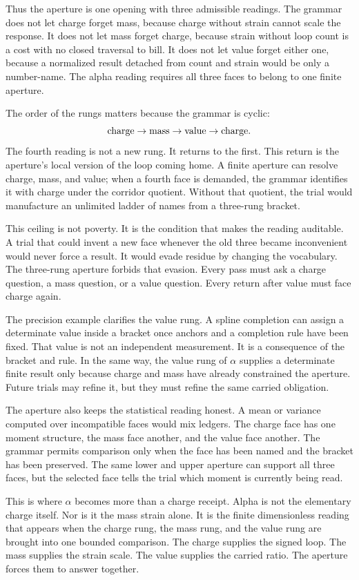 Thus the aperture is one opening with three admissible readings. The grammar
does not let charge forget mass, because charge without strain cannot scale
the response. It does not let mass forget charge, because strain without
loop count is a cost with no closed traversal to bill. It does not let value
forget either one, because a normalized result detached from count and strain
would be only a number-name. The alpha reading requires all three faces to
belong to one finite aperture.

The order of the rungs matters because the grammar is cyclic:
\[
  \hbox{charge} \to \hbox{mass} \to \hbox{value} \to \hbox{charge}.
\]
The fourth reading is not a new rung. It returns to the first. This return
is the aperture's local version of the loop coming home. A finite aperture
can resolve charge, mass, and value; when a fourth face is demanded, the
grammar identifies it with charge under the corridor quotient. Without that
quotient, the trial would manufacture an unlimited ladder of names from a
three-rung bracket.

This ceiling is not poverty. It is the condition that makes the reading
auditable. A trial that could invent a new face whenever the old three became
inconvenient would never force a result. It would evade residue by changing
the vocabulary. The three-rung aperture forbids that evasion. Every pass must
ask a charge question, a mass question, or a value question. Every return
after value must face charge again.

The precision example clarifies the value rung. A spline completion can
assign a determinate value inside a bracket once anchors and a completion
rule have been fixed. That value is not an independent measurement. It is a
consequence of the bracket and rule. In the same way, the value rung of
\(\alpha\) supplies a determinate finite result only because charge and mass
have already constrained the aperture. Future trials may refine it, but they
must refine the same carried obligation.

The aperture also keeps the statistical reading honest. A mean or variance
computed over incompatible faces would mix ledgers. The charge face has one
moment structure, the mass face another, and the value face another. The
grammar permits comparison only when the face has been named and the bracket
has been preserved. The same lower and upper aperture can support all three
faces, but the selected face tells the trial which moment is currently being
read.

This is where \(\alpha\) becomes more than a charge receipt. Alpha is not the
elementary charge itself. Nor is it the mass strain alone. It is the finite
dimensionless reading that appears when the charge rung, the mass rung, and
the value rung are brought into one bounded comparison. The charge supplies
the signed loop. The mass supplies the strain scale. The value supplies the
carried ratio. The aperture forces them to answer together.

